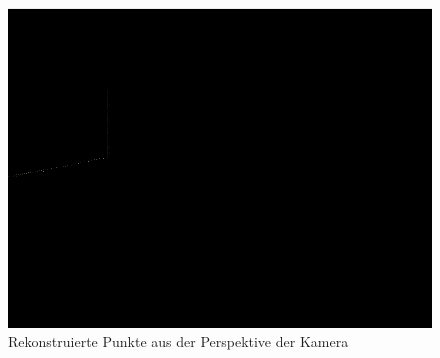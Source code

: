 \documentclass[xcolor=dvipsnames]{beamer}
\begin{document}
\begin{frame}
\begin{overlayarea}{\textwidth}{\textheight}
{\begin{figure}
				\includegraphics[width=0.8\linewidth]{includes/3d.png}
				\caption{Rekonstruierte Punkte aus der Perspektive der Kamera}
				\label{fig:example3}
			\end{figure}
		}
\end{overlayarea}
\end{frame}
\end{document}
